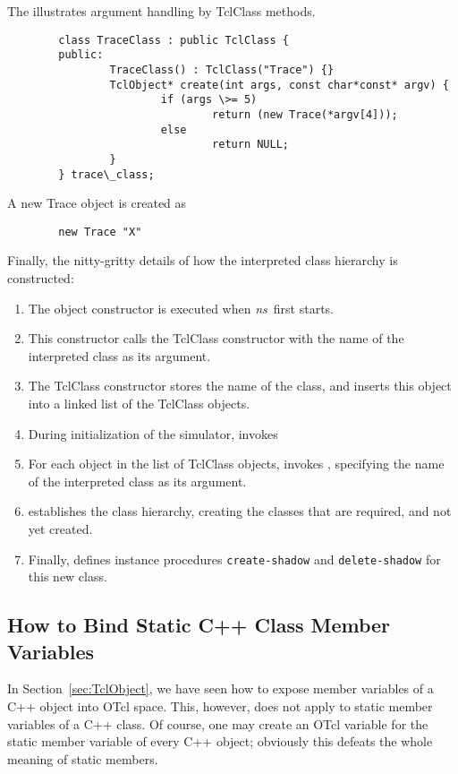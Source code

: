 The  illustrates
argument handling by TclClass methods.
\begin{verbatim}
        class TraceClass : public TclClass {
        public:
                TraceClass() : TclClass("Trace") {}
                TclObject* create(int args, const char*const* argv) {
                        if (args \>= 5)
                                return (new Trace(*argv[4]));
                        else
                                return NULL;
                }
        } trace\_class;
\end{verbatim}
A new Trace object is created as
\begin{verbatim}
        new Trace "X"
\end{verbatim}
Finally, the nitty-gritty details of how the 
interpreted class hierarchy is constructed:
\begin{enumerate}
\item The object constructor is executed when \emph{ns}\ first starts.
\item This constructor calls the TclClass constructor
  with the name of the interpreted class as its argument.
\item The TclClass constructor stores the name of the class,
  and inserts this object into a linked list of the TclClass objects.
\item During initialization of the simulator,
  invokes 
\item For each object in the list of TclClass objects,
   invokes 
  ,
  specifying the name of the interpreted class as its argument.
\item {} establishes the class hierarchy,
  creating the classes that are required, and not yet created.
\item Finally,  defines instance procedures
  {\tt create-shadow} and {\tt delete-shadow} for this new class.
\end{enumerate}

\subsection{How to Bind Static C++ Class Member Variables}

In Section~\ref{sec:TclObject}, we have seen how to expose member
variables of a C++ object into OTcl space. 
This, however, does not apply to static member variables of a C++
class. 
Of course, one may create an OTcl variable for the static member
variable of every C++ object; obviously this defeats the whole meaning
of static members.

